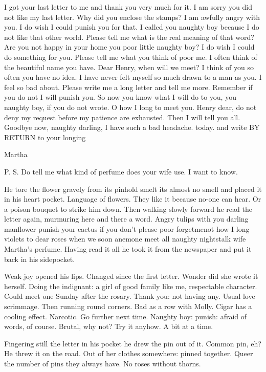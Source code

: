 I got your last letter to me and thank you very much for it. I am sorry
you did not like my last letter. Why did you enclose the stamps? I am
awfully angry with you. I do wish I could punish you for that. I called
you naughty boy because I do not like that other world. Please tell me
what is the real meaning of that word? Are you not happy in your home you
poor little naughty boy? I do wish I could do something for you. Please
tell me what you think of poor me. I often think of the beautiful name you
have. Dear Henry, when will we meet? I think of you so often you have no
idea. I have never felt myself so much drawn to a man as you. I feel so
bad about. Please write me a long letter and tell me more. Remember if you
do not I will punish you. So now you know what I will do to you, you
naughty boy, if you do not wrote. O how I long to meet you. Henry dear, do
not deny my request before my patience are exhausted. Then I will tell you
all. Goodbye now, naughty darling, I have such a bad headache. today. and
write BY RETURN to your longing


    Martha

P. S. Do tell me what kind of perfume does your wife use. I want to know.


He tore the flower gravely from its pinhold smelt its almost no smell
and placed it in his heart pocket. Language of flowers. They like it
because no-one can hear. Or a poison bouquet to strike him down. Then
walking slowly forward he read the letter again, murmuring here and there
a word. Angry tulips with you darling manflower punish your cactus if you
don't please poor forgetmenot how I long violets to dear roses when we
soon anemone meet all naughty nightstalk wife Martha's perfume. Having
read it all he took it from the newspaper and put it back in his
sidepocket.

Weak joy opened his lips. Changed since the first letter. Wonder
did she wrote it herself. Doing the indignant: a girl of good
family like me, respectable character. Could meet one Sunday after the
rosary. Thank you: not having any. Usual love scrimmage. Then running
round corners. Bad as a row with Molly. Cigar has a cooling effect.
Narcotic. Go further next time. Naughty boy: punish: afraid of words, of
course. Brutal, why not? Try it anyhow. A bit at a time.

Fingering still the letter in his pocket he drew the pin out of it.
Common pin, eh? He threw it on the road. Out of her clothes somewhere:
pinned together. Queer the number of pins they always have. No roses
without thorns.

